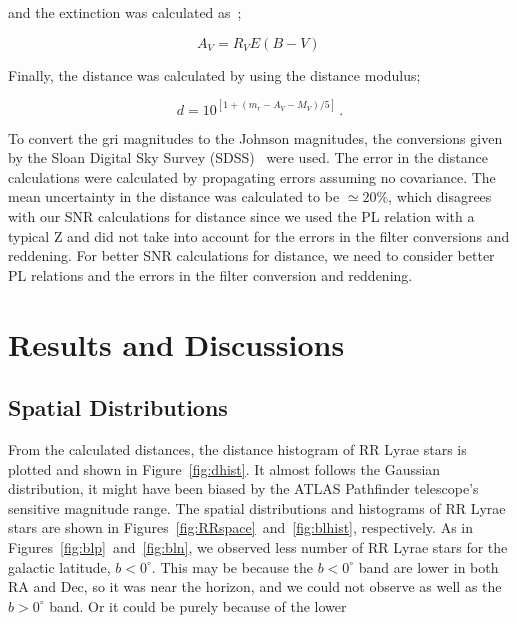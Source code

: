 \documentclass[aps,prb,twocolumn,superscriptaddress]{revtex4-1}
\begin{document}
\noindent and the extinction was calculated as~\cite{Modern};

\begin{equation}
\label{Av}
A_V = R_V E(B-V) \,
\end{equation}

\noindent Finally, the distance was calculated by using the distance modulus;

\begin{equation}
\label{dist}
d = 10^{[1+(m_r - A_V - M_V)/5]} \, .
\end{equation}

\noindent To convert the gri magnitudes to the Johnson magnitudes, the conversions given by the Sloan Digital Sky Survey (SDSS)~\cite{SDSS} were used. The error in the distance calculations were calculated by propagating errors assuming no covariance. The mean uncertainty in the distance was calculated to be $\simeq 20 \%$, which disagrees with our SNR calculations for distance since we used the PL relation with a typical Z and did not take into account for the errors in the filter conversions and reddening. For better SNR calculations for distance, we need to consider better PL relations and the errors in the filter conversion and reddening.  



\section{Results and Discussions}\label{sec:ResDis}

\subsection{Spatial Distributions}

From the calculated distances, the distance histogram of RR Lyrae stars is plotted and shown in Figure~\ref{fig:dhist}. It almost follows the Gaussian distribution, it might have been biased by the ATLAS Pathfinder telescope's sensitive magnitude range. The spatial distributions and histograms of RR Lyrae stars are shown in  Figures~\ref{fig:RRspace}~and~\ref{fig:blhist}, respectively. As in Figures~\ref{fig:blp}~and~\ref{fig:bln}, we observed less number of RR Lyrae stars for the galactic latitude, $b<0^{\circ}$. This may be because the $b<0^{\circ}$ band are lower in both RA and Dec, so it was near the horizon, and we could not observe as well as the $b>0^{\circ}$ band. Or it could be purely because of the lower 
\end{document}
